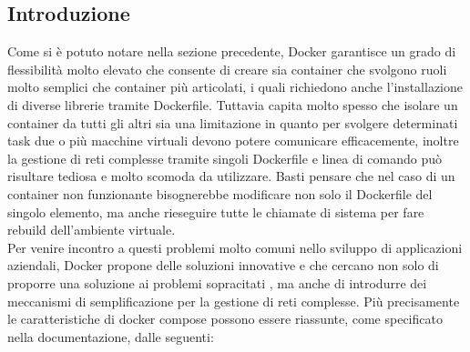 \subsection{Introduzione}
Come si è potuto notare nella sezione precedente, Docker garantisce un grado di flessibilità molto elevato che consente di creare sia container che svolgono ruoli molto semplici che container più articolati, i quali richiedono anche l'installazione di diverse
librerie tramite Dockerfile. Tuttavia capita molto spesso che isolare un container da  tutti gli altri sia una limitazione in quanto per svolgere determinati task due o più macchine virtuali devono potere comunicare efficacemente, inoltre la gestione
di reti complesse tramite singoli Dockerfile e linea di comando può risultare tediosa e molto scomoda da utilizzare. Basti pensare che nel caso di un container non funzionante bisognerebbe modificare non solo il Dockerfile del singolo elemento, ma anche rieseguire tutte le chiamate
di sistema per fare rebuild dell'ambiente virtuale. \\
Per venire incontro a questi problemi molto comuni nello sviluppo di applicazioni aziendali, Docker propone delle soluzioni innovative e che cercano non solo di proporre una soluzione ai problemi sopracitati , ma anche di introdurre dei meccanismi di semplificazione per la gestione di reti complesse.
Più precisamente le caratteristiche di docker compose possono essere riassunte, come specificato nella documentazione\cite{docker-compose}, dalle seguenti:

